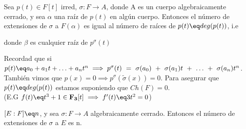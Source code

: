 \documentclass{apuntes}
\begin{document}
\begin{corol}
Sea $p(t) \in F[t]$ irred, $\sigma: F \rightarrow A$, donde A es un cuerpo algebraicamente cerrado, y sea $\alpha$ una raíz de $p(t)$ en algún cuerpo. Entonces el número de extensiones de $\sigma$ a $F(\alpha)$ es igual al número de raíces de $p(t) \eq deg(p(t))$, i.e


donde $\beta$ es cualquier raíz de $p^{\sigma}(t)$

Recordad que si $p(t) \eq a_0 + a_1t + \ldots + a_n t^n \implies p^{\sigma}(t)~=~\sigma(a_0)~+~\sigma(a_1)t~+~\ldots~+~\sigma(a_n)t^n$.
También vimos que $p(x) = 0 \implies p^{\sigma}(\tilde{\sigma}(x)) = 0$.
Para asegurar que $p(t) \eq deg(p(t))$ estamos suponiendo que $Ch(F) = 0$.\\
(E.G $f(t) \eq t^3 + 1 \in \mathbf{F_3}[t] \implies f'(t) \eq 3t^2 = 0$)

\end{corol}



\begin{corol}
$[E:F] \eq n$, y sea $\sigma: F \rightarrow A$ algebraicamente cerrado.
Entonces el número de extensiones de $\sigma$ a $E$ es n.
\end{corol}
\end{document}
